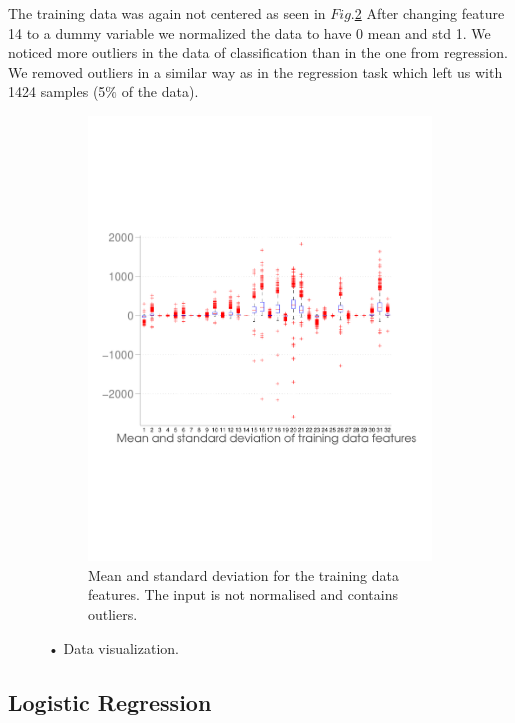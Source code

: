 The training data was again not centered as seen in $Fig.$\ref{fig:dist_classification}
 After changing feature 14 to a dummy variable we normalized the data to have 0 mean and std 1. We noticed more outliers in the data of classification than in the one from regression. We removed outliers in a similar way as in the regression task which left us with 1424 samples (5$\%$ of the data).
\begin{figure}[h]
  \begin{subfigure}[b]{0.5\textwidth}
   \includegraphics[width=\textwidth]{figures/classification_distribution.pdf}
    \caption{Mean and standard deviation for the training data features. The input is not normalised and contains outliers.}
    \label{fig:dist_classification}
  \end{subfigure}
  \caption{• Data visualization. }
\end{figure}

\subsection{Logistic Regression}

